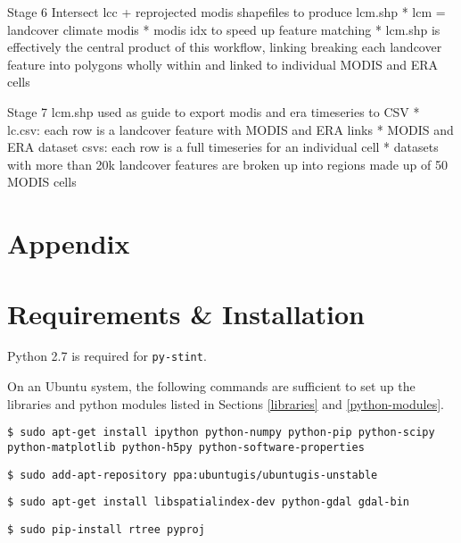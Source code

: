 \documentclass[twoside,a4paper]{refart}
\begin{document}
      Stage 6
        Intersect lcc + reprojected modis shapefiles to produce lcm.shp
        * lcm = landcover climate modis
        * modis idx to speed up feature matching
        * lcm.shp is effectively the central product of this workflow, linking
          breaking each landcover feature into polygons wholly within and
          linked to individual MODIS and ERA cells

      Stage 7
        lcm.shp used as guide to export modis and era timeseries to CSV
        * lc.csv: each row is a landcover feature with MODIS and ERA links
        * MODIS and ERA dataset csvs: each row is a full timeseries for an
          individual cell
        * datasets with more than 20k landcover features are broken up into
          regions made up of 50 MODIS cells


\clearpage
\section*{Appendix}
\appendix
\section{Requirements \& Installation}
\label{setup}

Python 2.7 is required for \texttt{py-stint}.

On an Ubuntu system, the following commands are sufficient to set up the libraries and python modules listed in Sections \ref{libraries} and \ref{python-modules}.

\texttt{\$ sudo apt-get install ipython python-numpy python-pip python-scipy python-matplotlib python-h5py python-software-properties}

\texttt{\$ sudo add-apt-repository ppa:ubuntugis/ubuntugis-unstable}

\texttt{\$ sudo apt-get install libspatialindex-dev python-gdal gdal-bin}

\texttt{\$ sudo pip-install rtree pyproj}
\end{document}
